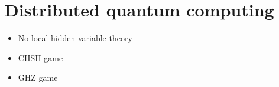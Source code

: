 \documentclass[a4paper,11pt]{article}
\begin{document}
\section{Distributed quantum computing}
\begin{itemize}
    \item No local hidden-variable theory \cite{bell-1964-on-the-einstein-podolsky-rosen-paradox}
    \item CHSH game \cite{clauser-horne-etal-1969-proposed-experiment-to-test}
    \item GHZ game \cite{greenberger-horne-zeilinger-1989-going-beyond-bell-s}
\end{itemize}



\end{document}
